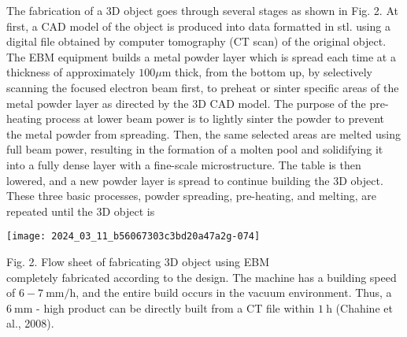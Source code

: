 \documentclass[10pt]{article}
\begin{document}
The fabrication of a 3D object goes through several stages as shown in Fig. 2. At first, a CAD model of the object is produced into data formatted in stl. using a digital file obtained by computer tomography (CT scan) of the original object. The EBM equipment builds a metal powder layer which is spread each time at a thickness of approximately $100 \mu \mathrm{m}$ thick, from the bottom up, by selectively scanning the focused electron beam first, to preheat or sinter specific areas of the metal powder layer as directed by the 3D CAD model. The purpose of the pre-heating process at lower beam power is to lightly sinter the powder to prevent the metal powder from spreading. Then, the same selected areas are melted using full beam power, resulting in the formation of a molten pool and solidifying it into a fully dense layer with a fine-scale microstructure. The table is then lowered, and a new powder layer is spread to continue building the 3D object. These three basic processes, powder spreading, pre-heating, and melting, are repeated until the 3D object is

\begin{center}
\texttt{[image: 2024\_03\_11\_b56067303c3bd20a47a2g-074]}
\end{center}

Fig. 2. Flow sheet of fabricating 3D object using EBM\\
completely fabricated according to the design. The machine has a building speed of $6-7 \mathrm{~mm} / \mathrm{h}$, and the entire build occurs in the vacuum environment. Thus, a $6 \mathrm{~mm}$ - high product can be directly built from a CT file within $1 \mathrm{~h}$ (Chahine et al., 2008).
\end{document}
